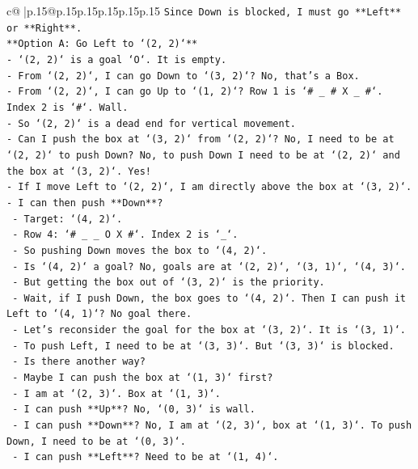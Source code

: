 \documentclass{article}
\begin{document}
{\begin{supertabular}{c@{$\;$}|p{.15\linewidth}@{}p{.15\linewidth}p{.15\linewidth}p{.15\linewidth}p{.15\linewidth}p{.15\linewidth}}
{{{\texttt{Since Down is blocked, I must go **Left** or **Right**.} \\
\texttt{**Option A: Go Left to `(2, 2)`**} \\
\texttt{{-} `(2, 2)` is a goal `O`. It is empty.} \\
\texttt{{-} From `(2, 2)`, I can go Down to `(3, 2)`? No, that's a Box.} \\
\texttt{{-} From `(2, 2)`, I can go Up to `(1, 2)`? Row 1 is `\# \_ \# X \_ \#`. Index 2 is `\#`. Wall.} \\
\texttt{{-} So `(2, 2)` is a dead end for vertical movement.} \\
\texttt{{-} Can I push the box at `(3, 2)` from `(2, 2)`? No, I need to be at `(2, 2)` to push Down? No, to push Down I need to be at `(2, 2)` and the box at `(3, 2)`. Yes!} \\
\texttt{{-} If I move Left to `(2, 2)`, I am directly above the box at `(3, 2)`.} \\
\texttt{{-} I can then push **Down**?} \\
\texttt{  {-} Target: `(4, 2)`.} \\
\texttt{  {-} Row 4: `\# \_ \_ O X \#`. Index 2 is `\_`.} \\
\texttt{  {-} So pushing Down moves the box to `(4, 2)`.} \\
\texttt{  {-} Is `(4, 2)` a goal? No, goals are at `(2, 2)`, `(3, 1)`, `(4, 3)`.} \\
\texttt{  {-} But getting the box out of `(3, 2)` is the priority.} \\
\texttt{  {-} Wait, if I push Down, the box goes to `(4, 2)`. Then I can push it Left to `(4, 1)`? No goal there.} \\
\texttt{  {-} Let's reconsider the goal for the box at `(3, 2)`. It is `(3, 1)`.} \\
\texttt{  {-} To push Left, I need to be at `(3, 3)`. But `(3, 3)` is blocked.} \\
\texttt{  {-} Is there another way?} \\
\texttt{  {-} Maybe I can push the box at `(1, 3)` first?} \\
\texttt{    {-} I am at `(2, 3)`. Box at `(1, 3)`.} \\
\texttt{    {-} I can push **Up**? No, `(0, 3)` is wall.} \\
\texttt{    {-} I can push **Down**? No, I am at `(2, 3)`, box at `(1, 3)`. To push Down, I need to be at `(0, 3)`.} \\
\texttt{    {-} I can push **Left**? Need to be at `(1, 4)`.} \\
}}}
\end{supertabular}}
\end{document}
